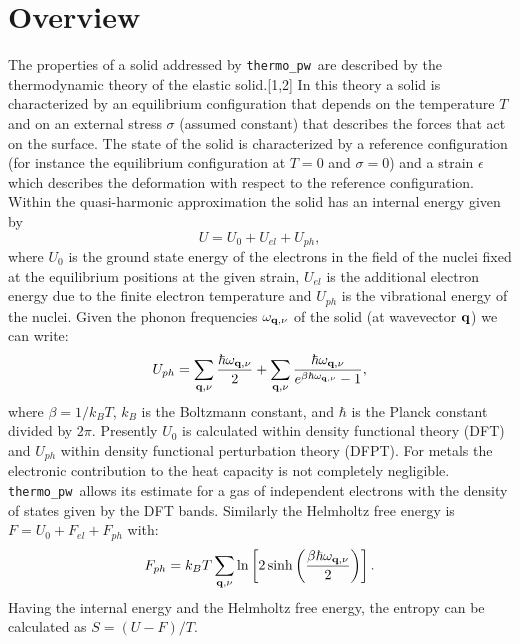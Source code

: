 \documentclass[12pt,a4paper]{article}
\def\tpw{\texttt{thermo\_pw}}
\begin{document}
\section{\color{coral}Overview}
The properties of a solid addressed by \tpw\ are described by the thermodynamic
theory of the elastic solid.[1,2] In this theory a solid is characterized by an
equilibrium configuration that depends on the temperature $T$ and on an
external stress $\sigma$ (assumed constant) that describes the forces 
that act on the surface. The state
of the solid is characterized by a reference configuration 
(for instance the equilibrium configuration at $T=0$ and $\sigma=0$) and 
a strain $\epsilon$ which describes the deformation with respect to the 
reference configuration. 
Within the quasi-harmonic approximation the solid has an internal
energy given by  
\begin{equation}
U=U_0 + U_{el} + U_{ph},
\end{equation}
where $U_0$ is the ground state energy of the electrons in the field 
of the nuclei fixed at the equilibrium positions at the given strain, 
$U_{el}$ is the additional electron energy due to the 
finite electron temperature and $U_{ph}$ is the vibrational energy of the nuclei. 
Given the phonon frequencies $\omega_{{\bf q},\nu}$ of the solid 
(at wavevector ${\bf q}$) we can write:
\begin{equation}
U_{ph} = \sum_{{\bf q},\nu} {\hbar \omega_{{\bf q},\nu} \over 2}
+ \sum_{{\bf q},\nu} {\hbar \omega_{{\bf q},\nu} \over 
e^{\beta \hbar \omega_{{\bf q},\nu}}-1},
\label{uvib}
\end{equation}
where $\beta=1/ k_B T$, $k_B$ is the Boltzmann constant, and $\hbar$ is the
Planck constant divided by $2\pi$.
Presently $U_0$ is calculated within density functional theory (DFT) and
$U_{ph}$ within density functional perturbation theory (DFPT). 
For metals the electronic contribution to the heat capacity is not 
completely negligible. \tpw\ allows its estimate for a gas of 
independent electrons with the density of states given by the DFT bands.
Similarly the Helmholtz free energy is $F=U_0+F_{el}+F_{ph}$ with:
\begin{equation}
F_{ph} = k_B T \sum_{{\bf q},\nu} \ln \left[ 2 \sinh \left({\beta \hbar 
\omega_{{\bf q},\nu} \over 2}\right) \right].
\nonumber
\end{equation}
Having the internal energy and the Helmholtz free energy, the entropy can 
be calculated as $S=(U-F)/T$.
\end{document}
